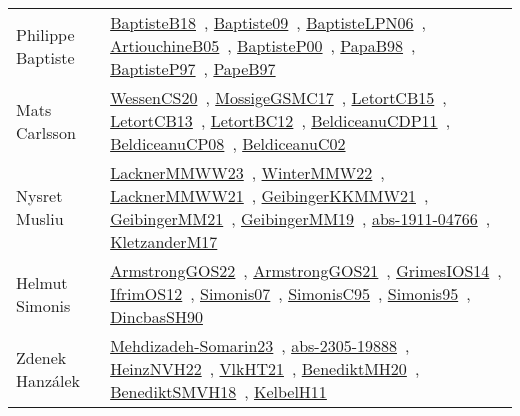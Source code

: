 {\begin{longtable}{p{4cm}p{20cm}}
Philippe Baptiste & \href{works/BaptisteB18.pdf}{BaptisteB18}~\cite{BaptisteB18}, \href{works/Baptiste09.pdf}{Baptiste09}~\cite{Baptiste09}, \href{}{BaptisteLPN06}~\cite{BaptisteLPN06}, \href{works/ArtiouchineB05.pdf}{ArtiouchineB05}~\cite{ArtiouchineB05}, \href{works/BaptisteP00.pdf}{BaptisteP00}~\cite{BaptisteP00}, \href{works/PapaB98.pdf}{PapaB98}~\cite{PapaB98}, \href{works/BaptisteP97.pdf}{BaptisteP97}~\cite{BaptisteP97}, \href{}{PapeB97}~\cite{PapeB97}\\
Mats Carlsson & \href{works/WessenCS20.pdf}{WessenCS20}~\cite{WessenCS20}, \href{works/MossigeGSMC17.pdf}{MossigeGSMC17}~\cite{MossigeGSMC17}, \href{works/LetortCB15.pdf}{LetortCB15}~\cite{LetortCB15}, \href{works/LetortCB13.pdf}{LetortCB13}~\cite{LetortCB13}, \href{works/LetortBC12.pdf}{LetortBC12}~\cite{LetortBC12}, \href{works/BeldiceanuCDP11.pdf}{BeldiceanuCDP11}~\cite{BeldiceanuCDP11}, \href{works/BeldiceanuCP08.pdf}{BeldiceanuCP08}~\cite{BeldiceanuCP08}, \href{works/BeldiceanuC02.pdf}{BeldiceanuC02}~\cite{BeldiceanuC02}\\
Nysret Musliu & \href{works/LacknerMMWW23.pdf}{LacknerMMWW23}~\cite{LacknerMMWW23}, \href{works/WinterMMW22.pdf}{WinterMMW22}~\cite{WinterMMW22}, \href{works/LacknerMMWW21.pdf}{LacknerMMWW21}~\cite{LacknerMMWW21}, \href{works/GeibingerKKMMW21.pdf}{GeibingerKKMMW21}~\cite{GeibingerKKMMW21}, \href{works/GeibingerMM21.pdf}{GeibingerMM21}~\cite{GeibingerMM21}, \href{works/GeibingerMM19.pdf}{GeibingerMM19}~\cite{GeibingerMM19}, \href{works/abs-1911-04766.pdf}{abs-1911-04766}~\cite{abs-1911-04766}, \href{works/KletzanderM17.pdf}{KletzanderM17}~\cite{KletzanderM17}\\
Helmut Simonis & \href{works/ArmstrongGOS22.pdf}{ArmstrongGOS22}~\cite{ArmstrongGOS22}, \href{works/ArmstrongGOS21.pdf}{ArmstrongGOS21}~\cite{ArmstrongGOS21}, \href{works/GrimesIOS14.pdf}{GrimesIOS14}~\cite{GrimesIOS14}, \href{works/IfrimOS12.pdf}{IfrimOS12}~\cite{IfrimOS12}, \href{works/Simonis07.pdf}{Simonis07}~\cite{Simonis07}, \href{works/SimonisC95.pdf}{SimonisC95}~\cite{SimonisC95}, \href{works/Simonis95.pdf}{Simonis95}~\cite{Simonis95}, \href{works/DincbasSH90.pdf}{DincbasSH90}~\cite{DincbasSH90}\\
Zdenek Hanz{\'{a}}lek & \href{works/Mehdizadeh-Somarin23.pdf}{Mehdizadeh-Somarin23}~\cite{Mehdizadeh-Somarin23}, \href{works/abs-2305-19888.pdf}{abs-2305-19888}~\cite{abs-2305-19888}, \href{works/HeinzNVH22.pdf}{HeinzNVH22}~\cite{HeinzNVH22}, \href{works/VlkHT21.pdf}{VlkHT21}~\cite{VlkHT21}, \href{works/BenediktMH20.pdf}{BenediktMH20}~\cite{BenediktMH20}, \href{works/BenediktSMVH18.pdf}{BenediktSMVH18}~\cite{BenediktSMVH18}, \href{works/KelbelH11.pdf}{KelbelH11}~\cite{KelbelH11}\\

\end{longtable}}
